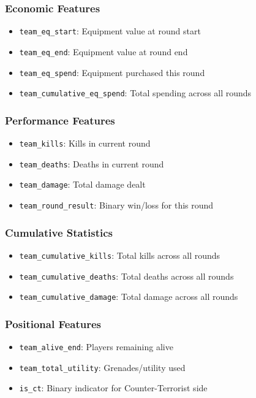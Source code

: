 \documentclass[11pt]{article}
\begin{document}
\subsubsection{Economic Features}
\begin{itemize}
    \item \texttt{team\_eq\_start}: Equipment value at round start
    \item \texttt{team\_eq\_end}: Equipment value at round end
    \item \texttt{team\_eq\_spend}: Equipment purchased this round
    \item \texttt{team\_cumulative\_eq\_spend}: Total spending across all rounds
\end{itemize}

\subsubsection{Performance Features}
\begin{itemize}
    \item \texttt{team\_kills}: Kills in current round
    \item \texttt{team\_deaths}: Deaths in current round
    \item \texttt{team\_damage}: Total damage dealt
    \item \texttt{team\_round\_result}: Binary win/loss for this round
\end{itemize}

\subsubsection{Cumulative Statistics}
\begin{itemize}
    \item \texttt{team\_cumulative\_kills}: Total kills across all rounds
    \item \texttt{team\_cumulative\_deaths}: Total deaths across all rounds
    \item \texttt{team\_cumulative\_damage}: Total damage across all rounds
\end{itemize}

\subsubsection{Positional Features}
\begin{itemize}
    \item \texttt{team\_alive\_end}: Players remaining alive
    \item \texttt{team\_total\_utility}: Grenades/utility used
    \item \texttt{is\_ct}: Binary indicator for Counter-Terrorist side
\end{itemize}
\end{document}
